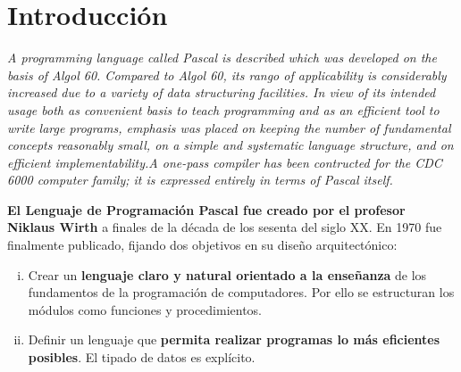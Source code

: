 
\label{chap:cap3}

\section{Introducción}

\textit{A programming language called Pascal is described which was developed
on the basis of Algol 60. Compared to Algol 60, its rango of applicability is
considerably increased due to a variety of data structuring facilities. In view
of its intended usage both as convenient basis to teach programming and as an
efficient tool to write large programs, emphasis was placed on keeping the
number of fundamental concepts reasonably small, on a simple and systematic
language structure, and on efficient implementability.A one-pass compiler has
been contructed for the CDC 6000 computer family; it is expressed entirely in
terms of Pascal itself.}  \cite{article/pascal/tplp}


\textbf{El Lenguaje de Programación Pascal fue creado por el profesor
Niklaus Wirth} a finales de la década de los
sesenta del siglo
XX. En 1970 fue
finalmente publicado,
fijando dos objetivos en su diseño arquitectónico:

\begin{enumerate}[i.] 
\item Crear un \textbf{lenguaje claro y natural orientado a la enseñanza} de los
fundamentos de la programación de computadores. Por ello se estructuran los
módulos como funciones y procedimientos.
\item Definir un lenguaje que \textbf{permita realizar programas lo más
eficientes
posibles}. El tipado de datos es explícito.
\end{enumerate}

